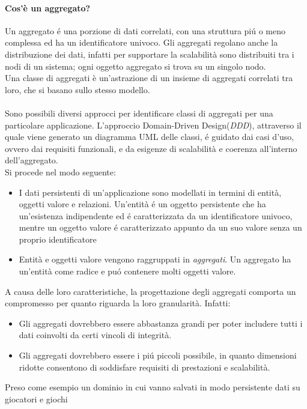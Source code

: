 \paragraph{Cos'è un aggregato?}
Un aggregato é una porzione di dati correlati, con una struttura piú o meno complessa ed ha un identificatore univoco.
Gli aggregati regolano anche la distribuzione dei dati, infatti per supportare la scalabilità sono distribuiti tra i nodi
di un sistema;
ogni oggetto aggregato si trova su un singolo nodo.\\
Una classe di aggregati è un'astrazione di un insieme di aggregati correlati tra loro, che si basano sullo stesso modello.\\
\\
Sono possibili diversi approcci per identificare classi di aggregati per una particolare applicazione.
L'approccio Domain-Driven Design(\emph{DDD}), attraverso il quale viene generato un diagramma UML delle classi,
é guidato dai casi d'uso, ovvero dai requisiti funzionali, e da esigenze di scalabilità e coerenza all'interno dell'aggregato.\\
Si procede nel modo seguente:
\begin{itemize}
    \item I dati persistenti di un'applicazione sono modellati in termini di entità, oggetti valore e
    relazioni.
    Un'entità é un oggetto persistente che ha un'esistenza indipendente ed é caratterizzata da un identificatore
    univoco, mentre un oggetto valore é caratterizzato appunto da un suo valore senza un proprio identificatore
    \item Entità e oggetti valore vengono raggruppati in \emph{aggregati}.
    Un aggregato ha un'entità come radice e puó contenere molti oggetti valore.
\end{itemize}
A causa delle loro caratteristiche, la progettazione degli aggregati comporta un compromesso per quanto riguarda
la loro granularità.
Infatti:
\begin{itemize}
    \item Gli aggregati dovrebbero essere abbastanza grandi per poter includere tutti i dati coinvolti da
    certi vincoli di integrità.
    \item Gli aggregati dovrebbero essere i piú piccoli possibile, in quanto dimensioni ridotte consentono di
    soddisfare requisiti di prestazioni e scalabilità.
\end{itemize}
Preso come esempio un dominio in cui vanno salvati in modo persistente dati su giocatori e giochi
